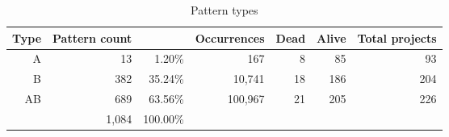 \begin{table}[H]
\caption{Pattern types}\label{table:pattern_type_counts}
\centering
\begin{tabular}{rrr|r|rrr}
\hline
	\bfseries{Type}\rm & \bfseries{Pattern count}\rm & & \bfseries{Occurrences}\rm
	& \bfseries{Dead}\rm & \bfseries{Alive}\rm & \bfseries{Total projects}\rm \\
	\hline
	A & 13 & 1.20\% & 167 & 8 & 85 & 93 \\
	B & 382 & 35.24\% & 10,741 & 18 & 186 & 204 \\
	AB & 689 & 63.56\% & 100,967 & 21 & 205 & 226 \\
	\hline
	 & 1,084 & 100.00\% &  \\
\hline
\end{tabular}
\end{table}
